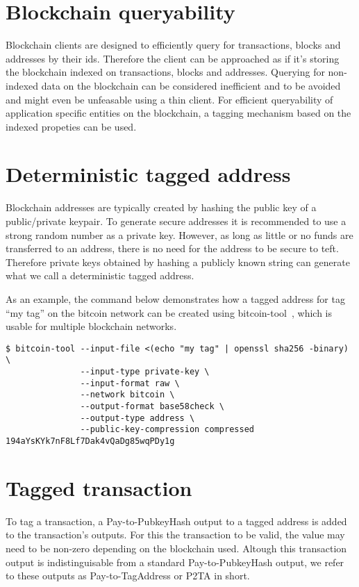 \documentclass[a4paper,10pt]{article}
\begin{document}
\section{Blockchain queryability}
Blockchain clients are designed to efficiently query for transactions, blocks and addresses by their ids.
Therefore the client can be approached as if it's storing the blockchain indexed on transactions, blocks and addresses.
Querying for non-indexed data on the blockchain can be considered inefficient and to be avoided and might even be unfeasable using a thin client.
For efficient queryability of application specific entities on the blockchain, a tagging mechanism based on the indexed propeties can be used.

\section{Deterministic tagged address}
\label{sec:taggedaddress}
Blockchain addresses are typically created by hashing the public key of a public/private keypair.
To generate secure addresses it is recommended to use a strong random number as a private key.
However, as long as little or no funds are transferred to an address, there is no need for the address to be secure to teft.
Therefore private keys obtained by hashing a publicly known string can generate what we call a deterministic tagged address.

As an example, the command below demonstrates how a tagged address for tag ``my tag'' on the bitcoin network can be created using bitcoin-tool~\cite{Matja}, which is usable for multiple blockchain networks.
\begin{verbatim}
$ bitcoin-tool --input-file <(echo "my tag" | openssl sha256 -binary) \
               --input-type private-key \
               --input-format raw \
               --network bitcoin \
               --output-format base58check \
               --output-type address \
               --public-key-compression compressed
194aYsKYk7nF8Lf7Dak4vQaDg85wqPDy1g
\end{verbatim}

\section{Tagged transaction}
To tag a transaction, a Pay-to-PubkeyHash output to a tagged address is added to the transaction's outputs.
For this the transaction to be valid, the value may need to be non-zero depending on the blockchain used.
Altough this transaction output is indistinguisable from a standard Pay-to-PubkeyHash output, we refer to these outputs as Pay-to-TagAddress or P2TA in short.
\end{document}
